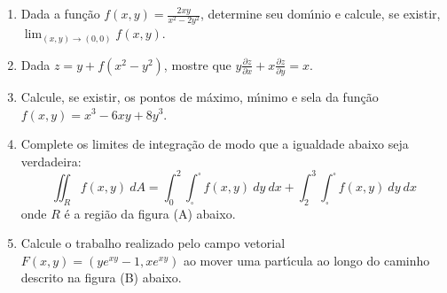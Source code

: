 \documentclass[a4paper,5pt]{amsbook}
\newcommand{\ds}{\displaystyle}
\begin{document}
\vspace{0.2cm}
\begin{enumerate}
	\vspace{0.5cm}

	\item Dada a fun\c{c}\~ao $\ds{}f(x,y) = \frac{2xy}{x^2-2y^2}$, determine seu dom\'{\i}nio
		e calcule, se existir, $\ds{}\lim_{(x,y)\rightarrow(0,0)} f(x,y)$.
	\vspace{0.5cm}

	\item Dada $z = y + f(x^2-y^2)$, mostre que $\ds{} y\frac{\partial
			z}{\partial x} + x\frac{\partial z}{\partial y} = x$.
	\vspace{0.5cm}

	\item Calcule, se existir, os pontos de m\'aximo, m\'{\i}nimo e sela da fun\c{c}\~ao $f(x,y) = x^3 - 6xy + 8y^3$.
	\vspace{0.5cm}

	\item Complete os limites de integra\c{c}\~ao de modo que a igualdade abaixo seja verdadeira:
		\begin{equation*}
			\iint_R f(x,y)\ dA = \int_0^2 \int_\square^\square f(x,y)\ dy\ dx +
			\int_2^3 \int_\square^\square f(x,y)\ dy\ dx
		\end{equation*}
		onde $R$ \'e a regi\~ao da figura (A) abaixo.
	\vspace{0.5cm}

	\item
		Calcule o trabalho realizado pelo campo vetorial $F(x,y) =
		(ye^{xy}-1, xe^{xy})$ ao mover uma part\'{\i}cula ao longo do caminho
		descrito na figura (B) abaixo.


\end{enumerate}
\end{document}
